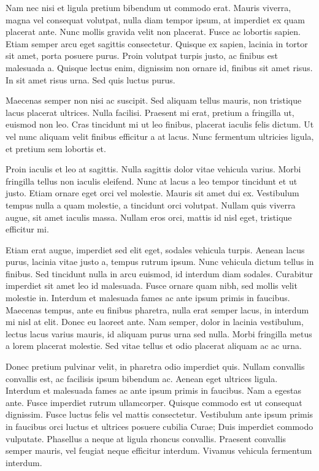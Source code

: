 \documentclass[11pt,]{article}
\begin{document}
Nam nec nisi et ligula pretium bibendum ut commodo erat. Mauris viverra,
magna vel consequat volutpat, nulla diam tempor ipsum, at imperdiet ex
quam placerat ante. Nunc mollis gravida velit non placerat. Fusce ac
lobortis sapien. Etiam semper arcu eget sagittis consectetur. Quisque ex
sapien, lacinia in tortor sit amet, porta posuere purus. Proin volutpat
turpis justo, ac finibus est malesuada a. Quisque lectus enim, dignissim
non ornare id, finibus sit amet risus. In sit amet risus urna. Sed quis
luctus purus.

Maecenas semper non nisi ac suscipit. Sed aliquam tellus mauris, non
tristique lacus placerat ultrices. Nulla facilisi. Praesent mi erat,
pretium a fringilla ut, euismod non leo. Cras tincidunt mi ut leo
finibus, placerat iaculis felis dictum. Ut vel nunc aliquam velit
finibus efficitur a at lacus. Nunc fermentum ultricies ligula, et
pretium sem lobortis et.

Proin iaculis et leo at sagittis. Nulla sagittis dolor vitae vehicula
varius. Morbi fringilla tellus non iaculis eleifend. Nunc at lacus a leo
tempor tincidunt et ut justo. Etiam ornare eget orci vel molestie.
Mauris sit amet dui ex. Vestibulum tempus nulla a quam molestie, a
tincidunt orci volutpat. Nullam quis viverra augue, sit amet iaculis
massa. Nullam eros orci, mattis id nisl eget, tristique efficitur mi.

Etiam erat augue, imperdiet sed elit eget, sodales vehicula turpis.
Aenean lacus purus, lacinia vitae justo a, tempus rutrum ipsum. Nunc
vehicula dictum tellus in finibus. Sed tincidunt nulla in arcu euismod,
id interdum diam sodales. Curabitur imperdiet sit amet leo id malesuada.
Fusce ornare quam nibh, sed mollis velit molestie in. Interdum et
malesuada fames ac ante ipsum primis in faucibus. Maecenas tempus, ante
eu finibus pharetra, nulla erat semper lacus, in interdum mi nisl at
elit. Donec eu laoreet ante. Nam semper, dolor in lacinia vestibulum,
lectus lacus varius mauris, id aliquam purus urna sed nulla. Morbi
fringilla metus a lorem placerat molestie. Sed vitae tellus et odio
placerat aliquam ac ac urna.

Donec pretium pulvinar velit, in pharetra odio imperdiet quis. Nullam
convallis convallis est, ac facilisis ipsum bibendum ac. Aenean eget
ultrices ligula. Interdum et malesuada fames ac ante ipsum primis in
faucibus. Nam a egestas ante. Fusce imperdiet rutrum ullamcorper.
Quisque commodo est ut consequat dignissim. Fusce luctus felis vel
mattis consectetur. Vestibulum ante ipsum primis in faucibus orci luctus
et ultrices posuere cubilia Curae; Duis imperdiet commodo vulputate.
Phasellus a neque at ligula rhoncus convallis. Praesent convallis semper
mauris, vel feugiat neque efficitur interdum. Vivamus vehicula fermentum
interdum.
\end{document}
